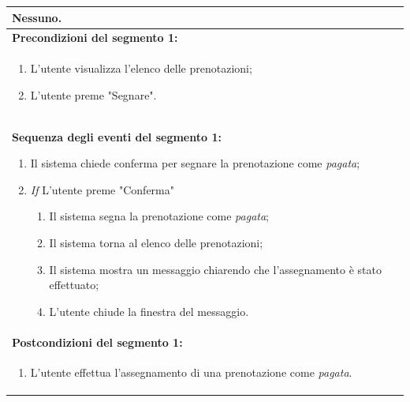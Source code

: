 \documentclass{article}
\begin{document}
\begin{table}[t]
\begin{tabular}{|p{\linewidth}|}
                        Nessuno. \\
                        \hline
                        \cellcolor{gray!20}
                        \textbf{Precondizioni del segmento 1:} \\
                        \cellcolor{gray!20}
                        \begin{minipage}{\linewidth}
                            \begin{enumerate}[noitemsep]
                                \item L'utente visualizza l'elenco delle prenotazioni;
                                \item L'utente preme "Segnare".
                            \end{enumerate}
                        \end{minipage}
                        \vspace{-5pt} \\
                        \hline
                        \textbf{Sequenza degli eventi del segmento 1:}
                        \begin{enumerate}
                            \item Il sistema chiede conferma per segnare la prenotazione come \emph{pagata};
                            \item \textit{If} L'utente preme "Conferma"
                            \begin{enumerate}
                                \item Il sistema segna la prenotazione come \emph{pagata};
                                \item Il sistema torna al elenco delle prenotazioni;
                                \item Il sistema mostra un messaggio chiarendo che l'assegnamento è stato effettuato;
                                \item L'utente chiude la finestra del messaggio.
                            \end{enumerate}
                        \end{enumerate} \\
                        \hline
                        \cellcolor{gray!20}
                        \textbf{Postcondizioni del segmento 1:} \\
                        \cellcolor{gray!20}
                        \begin{minipage}{\linewidth}
                            \begin{enumerate}[noitemsep]
                                \item L'utente effettua l'assegnamento di una prenotazione come \emph{pagata}.
                            \end{enumerate}
                        \end{minipage} \\
                        \hline
                    \end{tabular}
                \end{table}
\end{document}
